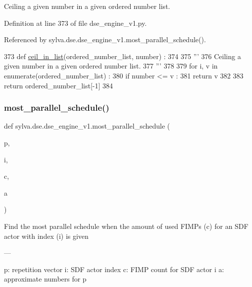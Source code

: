 \begin{DoxyVerb}  Ceiling a given number in a given ordered number list.
\end{DoxyVerb}
 

Definition at line 373 of file dse\+\_\+engine\+\_\+v1.\+py.



Referenced by sylva.\+dse.\+dse\+\_\+engine\+\_\+v1.\+most\+\_\+parallel\+\_\+schedule().


\begin{DoxyCode}
373 \textcolor{keyword}{def }\hyperlink{namespacesylva_1_1dse_1_1dse__engine__v1_af190117e4402a059bd348c6909abada2}{ceil\_in\_list}(ordered\_number\_list, number) :
374 
375   \textcolor{stringliteral}{'''}
376 \textcolor{stringliteral}{    Ceiling a given number in a given ordered number list.}
377 \textcolor{stringliteral}{  '''}
378 
379   \textcolor{keywordflow}{for} i, v \textcolor{keywordflow}{in} enumerate(ordered\_number\_list) :
380     \textcolor{keywordflow}{if} number <= v :
381       \textcolor{keywordflow}{return} v
382 
383   \textcolor{keywordflow}{return} ordered\_number\_list[-1]
384 
\end{DoxyCode}
\mbox{\label{namespacesylva_1_1dse_1_1dse__engine__v1_a2c16f997588f8721ab7742ca16e79e64}} 
\subsubsection{\texorpdfstring{most\+\_\+parallel\+\_\+schedule()}{most\_parallel\_schedule()}}
{\footnotesize\ttfamily def sylva.\+dse.\+dse\+\_\+engine\+\_\+v1.\+most\+\_\+parallel\+\_\+schedule (\begin{DoxyParamCaption}\item[{}]{p,  }\item[{}]{i,  }\item[{}]{c,  }\item[{}]{a }\end{DoxyParamCaption})}

\begin{DoxyVerb}  Find the most parallel schedule
  when the amount of used FIMPs (c)
  for an SDF actor with index (i) is given

  ---

  p: repetition vector
  i: SDF actor index
  c: FIMP count for SDF actor i
  a: approximate numbers for p
\end{DoxyVerb}
 

